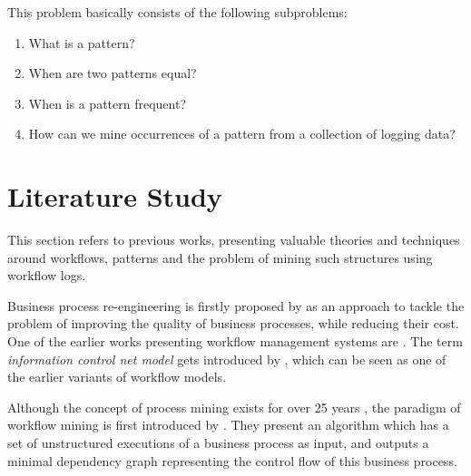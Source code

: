 \documentclass[a4paper,11pt]{article}
\begin{document}
This problem basically consists of the following subproblems:
\begin{enumerate}
\item What is a pattern?
\item When are two patterns equal?
\item When is a pattern frequent?
\item How can we mine occurrences of a pattern from a collection of logging data?
\end{enumerate}

\section{Literature Study}
This section refers to previous works, presenting valuable theories and techniques around workflows, patterns and the problem of mining such structures using workflow logs.

Business process re-engineering is firstly proposed by \cite{Hammer1990} as an approach to tackle the problem of improving the quality of business processes, while reducing their cost. One of the earlier works presenting workflow management systems are \cite{EngelGLT79, Ellis1982}. The term \textit{information control net model} gets introduced by \cite{Ellis1982}, which can be seen as one of the earlier variants of workflow models. 

Although the concept of process mining exists for over 25 years \cite{}, the paradigm of workflow mining is first introduced by \cite{Agrawal1998}. They present an algorithm which has a set of unstructured executions of a business process as input, and outputs a minimal dependency graph representing the control flow of this business process. 









\end{document}
